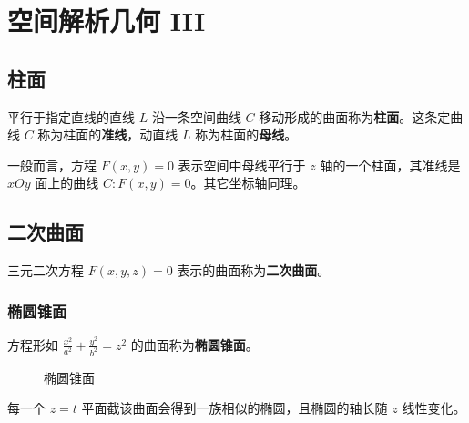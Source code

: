 \section{空间解析几何 III}

\subsection{柱面}

\begin{definition}[柱面]
	平行于指定直线的直线 $L$ 沿一条空间曲线 $C$ 移动形成的曲面称为\textbf{柱面}。这条定曲线 $C$ 称为柱面的\textbf{准线}，动直线 $L$ 称为柱面的\textbf{母线}。
\end{definition}

一般而言，方程 $F(x, y) = 0$ 表示空间中母线平行于 $z$ 轴的一个柱面，其准线是 $xOy$ 面上的曲线 $C: F(x, y) = 0$。其它坐标轴同理。

\subsection{二次曲面}

\begin{definition}[二次曲面]
	三元二次方程 $F(x, y, z) = 0$ 表示的曲面称为\textbf{二次曲面}。
\end{definition}

\subsubsection{椭圆锥面}

方程形如 $\frac{x^2}{a^2} + \frac{y^2}{b^2} = z^2$ 的曲面称为\textbf{椭圆锥面}。

\begin{figure}[H]
	\centering
	\caption{椭圆锥面}
\end{figure}

每一个 $z = t$ 平面截该曲面会得到一族相似的椭圆，且椭圆的轴长随 $z$ 线性变化。

